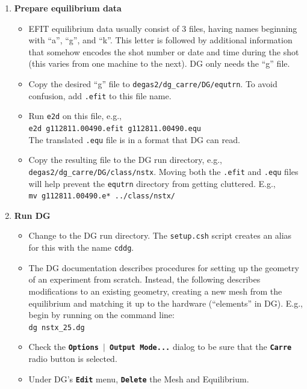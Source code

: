 \documentclass[12pt]{report}
\begin{document}
\begin{enumerate}
  \item {\bf Prepare equilibrium data}
  \begin{itemize}
    \item EFIT equilibrium data usually consist of 
3 files, having names beginning with 
``a'', ``g'', and ``k''.  This letter is followed by additional information
that somehow encodes the shot number or date and time during the
shot (this varies from one machine to the next). 
DG only needs the ``g'' file.
    \item Copy the desired ``g'' file to \verb+degas2/dg_carre/DG/equtrn+.  
To avoid confusion, add \verb+.efit+ to this file name.
    \item Run \verb+e2d+ on this file, e.g., \\
\verb+e2d g112811.00490.efit g112811.00490.equ+ \\
The translated \verb+.equ+ file is in a format that DG can read.
    \item Copy the resulting file to the DG run directory, 
e.g., \\
\verb+degas2/dg_carre/DG/class/nstx+.  
Moving both the \verb+.efit+ and \verb+.equ+ files 
will help prevent the {\tt equtrn} directory from getting cluttered.  E.g., \\
\verb+mv g112811.00490.e* ../class/nstx/+
  \end{itemize}
  \item {\bf Run DG}
  \begin{itemize}
    \item Change to the DG run directory.  The {\tt setup.csh} 
script creates an alias for this with the name \verb+cddg+.
    \item The DG documentation describes procedures for setting up the geometry
of an experiment from scratch.  Instead, the following describes 
modifications to an existing geometry, 
creating a new mesh from the equilibrium and
matching it up to the hardware (``elements'' in DG).  E.g., begin by
running on the command line: \\
\verb+dg nstx_25.dg+
    \item Check the 
\textbf{\texttt{Options  \begin{math}\vert{}\end{math} Output Mode...}} 
dialog to be sure that the \textbf{\texttt{Carre}} radio button is selected.
    \item Under DG's \textbf{\texttt{Edit}} menu, 
\textbf{\texttt{Delete}} the Mesh and Equilibrium.

\end{itemize}
\end{enumerate}
\end{document}
